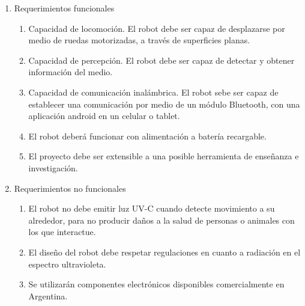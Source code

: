 \label{sec:requerimientos}

\begin{enumerate}
\item Requerimientos funcionales
	\begin{enumerate}
	\item Capacidad de locomoción.  El robot debe ser capaz de desplazarse por medio de ruedas motorizadas, a través de superficies planas.
	\item Capacidad de percepción. El robot debe ser capaz de detectar y obtener información del medio. 
	\item Capacidad de comunicación inalámbrica. El robot sebe ser capaz de establecer una comunicación  por medio de un módulo Bluetooth, con una aplicación android en un celular o tablet.
	\item El robot deberá funcionar con alimentación a batería recargable.
	\item El proyecto debe ser extensible a una posible herramienta de enseñanza e investigación.

	\end{enumerate}
\item Requerimientos no funcionales
	\begin{enumerate}
	\item El robot no debe emitir luz UV-C cuando detecte movimiento a su alrededor, para no producir daños a la salud de personas o animales con los que interactue.
	\item El diseño del robot debe respetar regulaciones en cuanto a radiación en el espectro ultravioleta.
	\item Se utilizarán componentes electrónicos disponibles comercialmente en Argentina.
	\end{enumerate}
\end{enumerate}

